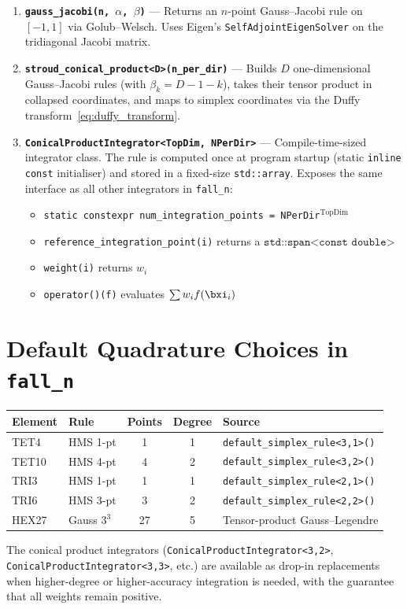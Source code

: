 \begin{enumerate}[leftmargin=2em]
  \item \textbf{\texttt{gauss\_jacobi(n, $\alpha$, $\beta$)}} ---
        Returns an $n$-point Gauss--Jacobi rule on $[-1,1]$ via Golub--Welsch.
        Uses Eigen's \texttt{SelfAdjointEigenSolver} on the tridiagonal Jacobi
        matrix.

  \item \textbf{\texttt{stroud\_conical\_product<D>(n\_per\_dir)}} ---
        Builds $D$ one-dimensional Gauss--Jacobi rules (with
        $\beta_k = D-1-k$), takes their tensor product in collapsed
        coordinates, and maps to simplex coordinates via the Duffy
        transform~\eqref{eq:duffy_transform}.

  \item \textbf{\texttt{ConicalProductIntegrator<TopDim, NPerDir>}} ---
        Compile-time-sized integrator class.  The rule is computed once at
        program startup (static \texttt{inline const} initialiser) and stored
        in a fixed-size \texttt{std::array}.  Exposes the same interface as
        all other integrators in \texttt{fall\_n}:
        \begin{itemize}[nosep]
          \item \texttt{static constexpr num\_integration\_points = NPerDir$^{\text{TopDim}}$}
          \item \texttt{reference\_integration\_point(i)} returns a $\texttt{std::span<const double>}$
          \item \texttt{weight(i)} returns $w_i$
          \item \texttt{operator()(f)} evaluates $\sum w_i f(\bxi_i)$
        \end{itemize}
\end{enumerate}


\section{Default Quadrature Choices in \texttt{fall\_n}}
\label{sec:default_rules}

\begin{center}
\begin{tabular}{llccl}
  \toprule
  Element & Rule & Points & Degree & Source \\
  \midrule
  TET4  & HMS 1-pt  & 1  & 1 & \texttt{default\_simplex\_rule<3,1>()} \\
  TET10 & HMS 4-pt  & 4  & 2 & \texttt{default\_simplex\_rule<3,2>()} \\
  TRI3  & HMS 1-pt  & 1  & 1 & \texttt{default\_simplex\_rule<2,1>()} \\
  TRI6  & HMS 3-pt  & 3  & 2 & \texttt{default\_simplex\_rule<2,2>()} \\
  HEX27 & Gauss $3^3$ & 27 & 5 & Tensor-product Gauss--Legendre \\
  \bottomrule
\end{tabular}
\end{center}

The conical product integrators (\texttt{ConicalProductIntegrator<3,2>},
\texttt{ConicalProductIntegrator<3,3>}, etc.) are available as drop-in
replacements when higher-degree or higher-accuracy integration is needed,
with the guarantee that all weights remain positive.
